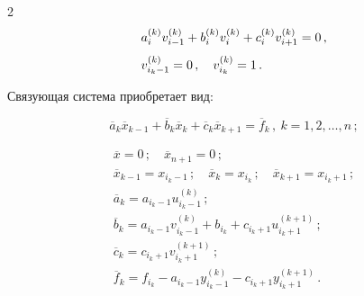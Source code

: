\begin{multicols}{2}
\begin{align}
 &    a_i^{(k)} v_{i-1}^{(k)} +b_i^{(k)}v_i^{(k)} +c_i^{(k)} v_{i+1}^{(k)}  =


0\,,\notag\\[-6pt]


     & \label{e15ol}\\[-6pt]


&     v^{(k)}_{i_k-1}  =0\,,\quad v_{i_k}^{(k)} =1\,.\notag


     \end{align}





     Связующая система приобретает вид:


     \begin{equation}


     \overline{a}_k \overline{x}_{k-1} +\overline{b}_k\overline{x}_k


+\overline{c}_k\overline{x}_{k+1} = \overline{f}_k\,,\ k=1, 2, \ldots , n\,;


     \label{e16ol}


     \end{equation}


     \vspace*{-9pt}


     


     \noindent


     \begin{gather*}


        \overline{x} =0\,;\quad \overline{x}_{n+1} =0\,;\\[2pt]


        \overline{x}_{k-1} = x_{i_k-1}\,;\quad \overline{x}_k = x_{i_k}\,;\quad \overline{x}_{k+1} = x_{i_k+1}\,;\\[2pt]


        \overline{a}_k = a_{i_k-1}u_{i_k-1}^{(k)}\,;\\[2pt]


     \overline{b}_k = a_{i_k-1} v^{(k)}_{i_k-1} +b_{i_k} +c_{i_k+1}


u^{(k+1)}_{i_k+1}\,;\\[2pt]


     \overline{c}_k = c_{i_k+1} v^{(k+1)}_{i_k+1}\,;\\[2pt]


     \overline{f}_k =  f_{i_k} -a_{i_k-1} y^{(k)}_{i_k-1} - c_{i_k+1}


y^{(k+1)}_{i_k+1}\,.


     \end{gather*}






\end{multicols}
